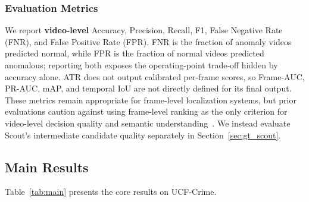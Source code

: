 \subsubsection{Evaluation Metrics}

We report \textbf{video-level} Accuracy, Precision, Recall, F1, False Negative Rate (FNR), and False Positive Rate (FPR). FNR is the fraction of anomaly videos predicted normal, while FPR is the fraction of normal videos predicted anomalous; reporting both exposes the operating-point trade-off hidden by accuracy alone. ATR does not output calibrated per-frame scores, so Frame-AUC, PR-AUC, mAP, and temporal IoU are not directly defined for its final output. These metrics remain appropriate for frame-level localization systems, but prior evaluations caution against using frame-level ranking as the only criterion for video-level decision quality and semantic understanding~\cite{doshi2022rethinking,zhang2024holmes,pi2024vader,chen2025ucvl}. We instead evaluate Scout's intermediate candidate quality separately in Section~\ref{sec:gt_scout}.

\subsection{Main Results}
\label{sec:main_results}

Table~\ref{tab:main} presents the core results on UCF-Crime.

